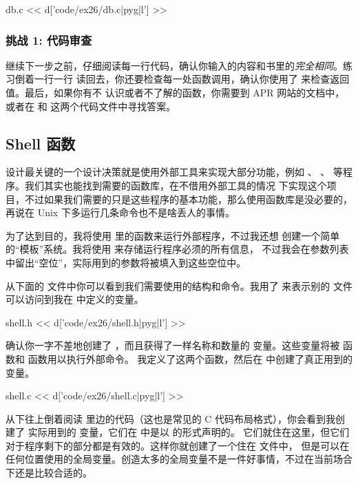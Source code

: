\begin{code}{db.c}
<< d['code/ex26/db.c|pyg|l'] >>
\end{code}

\subsubsection{挑战 1: 代码审查}

继续下一步之前，仔细阅读每一行代码，确认你输入的内容和书里的\emph{完全相同}。练习倒着一行一行
读回去，你还要检查每一处函数调用，确认你使用了  来检查返回值。最后，如果你有不
认识或者不了解的函数，你需要到 APR 网站的文档中，或者在  和   
这两个代码文件中寻找答案。


\subsection{Shell 函数}

 设计最关键的一个设计决策就是使用外部工具来实现大部分功能，例如 、
、 等程序。我们其实也能找到需要的函数库，在不借用外部工具的情况
下实现这个项目，不过如果我们需要的只是这些程序的基本功能，那么使用函数库是没必要的，再说在 
Unix 下多运行几条命令也不是啥丢人的事情。

为了达到目的，我将使用  里的函数来运行外部程序，不过我还想
创建一个简单的“模板”系统。我将使用  来存储运行程序必须的所有信息，
不过我会在参数列表中留出“空位”，实际用到的参数将被填入到这些空位中。

从下面的  文件中你可以看到我们需要使用的结构和命令。我用了  
来表示别的  文件可以访问到我在  中定义的变量。

\begin{code}{shell.h}
<< d['code/ex26/shell.h|pyg|l'] >>
\end{code}

确认你一字不差地创建了 ，而且获得了一样名称和数量的  
变量。这些变量将被  函数和  函数用以执行外部命令。
我定义了这两个函数，然后在  中创建了真正用到的变量。

\begin{code}{shell.c}
<< d['code/ex26/shell.c|pyg|l'] >>
\end{code}

从下往上倒着阅读  里边的代码（这也是常见的 C 代码布局格式），你会看到我创建了
实际用到的  变量，它们在  中是以  的形式声明的。
它们就住在这里，但它们对于程序剩下的部分都是有效的。这样你就创建了一个住在  文件中，
但是可以在任何位置使用的全局变量。创造太多的全局变量不是一件好事情，不过在当前场合下还是比较合适的。

